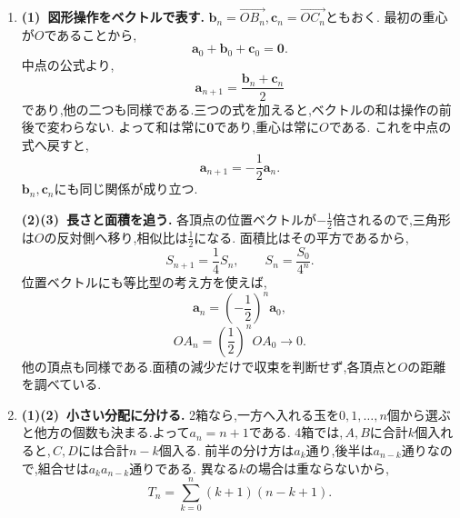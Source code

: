 \begin{enumerate}[label=\textbf{問\arabic*.},leftmargin=3.8em,format=\bookitemlink{practice-bridge}{solution}{problem}]
                \smallskip
                \textbf{(3)~平方数の余り.}
                初項も,更新式から得られる項もすべて奇数である.
                奇数の平方を$\displaystyle 4$で割った余りは$\displaystyle 1$なので,\,$\displaystyle n\ge1$の$\displaystyle a_n$の余りは$\displaystyle 2\cdot1+1=3$になる.
                一方,整数の平方の余りは,偶数を平方すれば$\displaystyle 0$,奇数を平方すれば$\displaystyle 1$である.
                したがって,\,$\displaystyle a_n$は整数の平方ではない.
                ここで立てたのは,元ののではなく,余りを追うである.
          \item \textbf{(1)~図形操作をベクトルで表す.}
                $\displaystyle \boldsymbol b_n=\overrightarrow{OB_n}$,\,$\displaystyle \boldsymbol c_n=\overrightarrow{OC_n}$ともおく.
                最初の重心が$\displaystyle O$であることから,
                \[
                  \boldsymbol a_0+\boldsymbol b_0+\boldsymbol c_0
                    =\boldsymbol0.
                \]
                中点の公式より,
                \[
                  \boldsymbol a_{n+1}
                    =\frac{\boldsymbol b_n+\boldsymbol c_n}{2}
                \]
                であり,他の二つも同様である.三つの式を加えると,ベクトルの和は操作の前後で変わらない.
                よって和は常に$\displaystyle \boldsymbol0$であり,重心は常に$\displaystyle O$である.
                これを中点の式へ戻すと,
                \[
                  \boldsymbol a_{n+1}=-\frac12\boldsymbol a_n.
                \]
                $\displaystyle \boldsymbol b_n,\boldsymbol c_n$にも同じ関係が成り立つ.

                \smallskip
                \textbf{(2)(3)~長さと面積を追う.}
                各頂点の位置ベクトルが$\displaystyle -\frac12$倍されるので,三角形は$\displaystyle O$の反対側へ移り,相似比は$\displaystyle \frac12$になる.
                面積比はその平方であるから,
                \[
                  S_{n+1}=\frac14S_n,\qquad S_n=\frac{S_0}{4^n}.
                \]
                位置ベクトルにも等比型の考え方を使えば,
                \[
                  \boldsymbol a_n=\left(-\frac12\right)^n\boldsymbol a_0,
                \]
                \[
                  OA_n=\left(\frac12\right)^n OA_0\longrightarrow0.
                \]
                他の頂点も同様である.面積の減少だけで収束を判断せず,各頂点と$\displaystyle O$の距離を調べている.
          \item \textbf{(1)(2)~小さい分配に分ける.}
                2箱なら,一方へ入れる玉を$\displaystyle 0,1,\ldots,n$個から選ぶと他方の個数も決まる.よって$\displaystyle a_n=n+1$である.
                4箱では,\,$\displaystyle A,B$に合計$\displaystyle k$個入れると,\,$\displaystyle C,D$には合計$\displaystyle n-k$個入る.
                前半の分け方は$\displaystyle a_k$通り,後半は$\displaystyle a_{n-k}$通りなので,組合せは$\displaystyle a_ka_{n-k}$通りである.
                異なる$\displaystyle k$の場合は重ならないから,
                \[
                  T_n=\sum_{k=0}^{n}(k+1)(n-k+1).
                \]


\end{enumerate}
